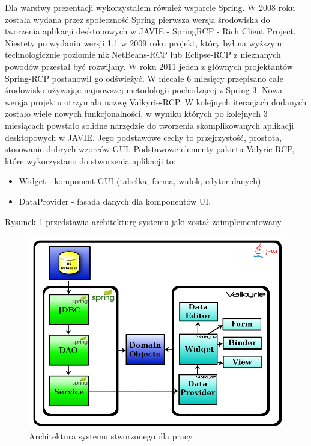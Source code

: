 Dla warstwy prezentacji wykorzystałem również wsparcie Spring. W 2008 roku została wydana przez społeczność Spring pierwsza wersja środowiska do tworzenia aplikacji desktopowych w JAVIE - SpringRCP - Rich Client Project. Niestety po wydaniu wersji 1.1 w 2009 roku projekt, który był na wyższym technologicznie poziomie niż NetBeans-RCP lub Eclipse-RCP z nieznanych powodów przestał być rozwijany\cite{spring_rcp_reference}. W roku 2011 jeden z głównych projektantów Spring-RCP postanowił go odświeżyć. W niecałe 6 miesięcy przepisano całe środowisko używając najnowszej metodologii pochodzącej z Spring 3. Nowa wersja projektu otrzymała nazwę Valkyrie-RCP\cite{valkyrie_reference}. W kolejnych iteracjach dodanych zostało wiele nowych funkcjonalności, w wyniku których po kolejnych 3 miesiącach powstało solidne narzędzie do tworzenia skomplikowanych aplikacji desktopowych w JAVIE. Jego podstawowe cechy to przejrzystość, prostota, stosowanie dobrych wzorców GUI.
Podstawowe elementy pakietu Valyrie-RCP, które wykorzystano do stworzenia aplikacji to\cite{valkyrie_reference}:
\begin{itemize}
 \item Widget - komponent GUI (tabelka, forma, widok, edytor-danych).
 \item DataProvider - fasada danych dla komponentów UI.
\end{itemize}

Rysunek \ref{img:rysunek_spring2} przedstawia architekturę systemu jaki został zaimplementowany.

\begin{figure}[!ht]
\centering
\includegraphics[scale=0.4]{images/spring-layers2}
\caption[Rysunek przedstawiający model architektury systemu]{Architektura systemu stworzonego dla pracy.}
\label{img:rysunek_spring2}
\end{figure}

